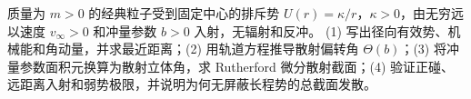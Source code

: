 质量为 \(m>0\) 的经典粒子受到固定中心的排斥势 \(U(r)=\kappa/r\)，\(\kappa>0\)，由无穷远以速度 \(v_\infty>0\) 和冲量参数 \(b>0\) 入射，无辐射和反冲。
(1) 写出径向有效势、机械能和角动量，并求最近距离；(2) 用轨道方程推导散射偏转角 \(\Theta(b)\)；(3) 将冲量参数面积元换算为散射立体角，求 Rutherford 微分散射截面；(4) 验证正碰、远距离入射和弱势极限，并说明为何无屏蔽长程势的总截面发散。

